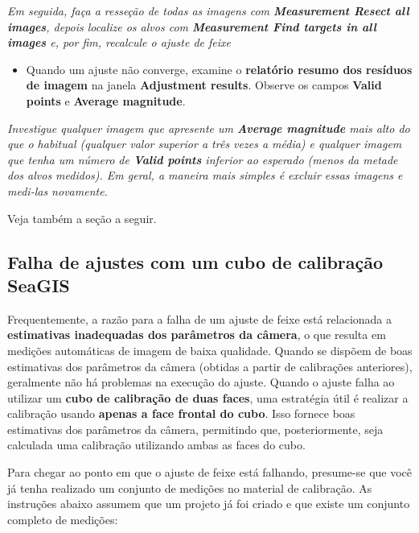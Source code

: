 \documentclass[
  12pt,
  letterpaper,
  DIV=11,
  numbers=noendperiod]{scrreprt}
\providecommand{\tightlist}{%
  \setlength{\itemsep}{0pt}\setlength{\parskip}{0pt}}
\begin{document}
\emph{Em seguida, faça a resseção de todas as imagens com
\textbf{Measurement \textbar{} Resect all images}, depois localize os
alvos com \textbf{Measurement \textbar{} Find targets in all images} e,
por fim, recalcule o ajuste de feixe}

\begin{itemize}
\tightlist
\item
  Quando um ajuste não converge, examine o \textbf{relatório resumo dos
  resíduos de imagem} na janela \textbf{Adjustment results}. Observe os
  campos \textbf{Valid points} e \textbf{Average magnitude}.
\end{itemize}

\emph{Investigue qualquer imagem que apresente um \textbf{Average
magnitude} mais alto do que o habitual (qualquer valor superior a três
vezes a média) e qualquer imagem que tenha um número de \textbf{Valid
points} inferior ao esperado (menos da metade dos alvos medidos). Em
geral, a maneira mais simples é excluir essas imagens e medi-las
novamente.}

Veja também a seção a seguir.

\subsection{Falha de ajustes com um cubo de calibração
SeaGIS}\label{sec-falha-ajustes}

Frequentemente, a razão para a falha de um ajuste de feixe está
relacionada a \textbf{estimativas inadequadas dos parâmetros da câmera},
o que resulta em medições automáticas de imagem de baixa qualidade.
Quando se dispõem de boas estimativas dos parâmetros da câmera (obtidas
a partir de calibrações anteriores), geralmente não há problemas na
execução do ajuste. Quando o ajuste falha ao utilizar um \textbf{cubo de
calibração de duas faces}, uma estratégia útil é realizar a calibração
usando \textbf{apenas a face frontal do cubo}. Isso fornece boas
estimativas dos parâmetros da câmera, permitindo que, posteriormente,
seja calculada uma calibração utilizando ambas as faces do cubo.

Para chegar ao ponto em que o ajuste de feixe está falhando, presume-se
que você já tenha realizado um conjunto de medições no material de
calibração. As instruções abaixo assumem que um projeto já foi criado e
que existe um conjunto completo de medições:
\end{document}
